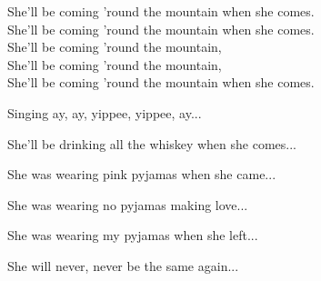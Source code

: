 \vspace{10pt}
She'll be coming 'round the mountain when she comes.\\
She'll be coming 'round the mountain when she comes.\\
She'll be coming 'round the mountain,\\
She'll be coming 'round the mountain,\\
She'll be coming 'round the mountain when she comes.\par
\vspace{10pt}
Singing ay, ay, yippee, yippee, ay...\par
\vspace{10pt}
She'll be drinking all the whiskey when she comes...\par
\vspace{10pt}
She was wearing pink pyjamas when she came...\par
\vspace{10pt}
She was wearing no pyjamas making love...\par
\vspace{10pt}
She was wearing my pyjamas when she left...\par
\vspace{10pt}
She will never, never be the same again...
